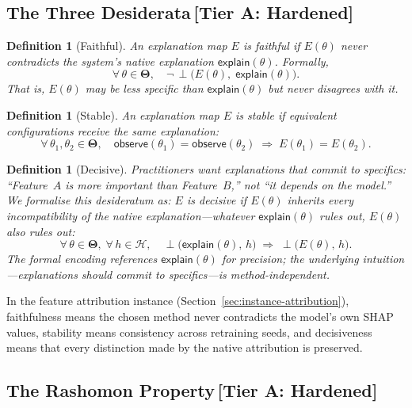 \documentclass[11pt,a4paper]{article}
\newtheorem{definition}[theorem]{Definition}
\newcommand{\Params}{\mathbf{\Theta}}
\newcommand{\sH}{\mathcal{H}}
\newcommand{\incomp}{\perp}
\begin{document}
\subsection{The Three Desiderata\,\textnormal{\normalsize[Tier A: Hardened]}}

\begin{definition}[Faithful]
\label{def:faithful}
An explanation map $E$ is \emph{faithful} if $E(\theta)$ never contradicts the
system's native explanation $\mathsf{explain}(\theta)$.  Formally,
\[
  \forall\,\theta \in \Params,\quad
  \neg\,\incomp\bigl(E(\theta),\;\mathsf{explain}(\theta)\bigr).
\]
That is, $E(\theta)$ may be less specific than $\mathsf{explain}(\theta)$ but
never disagrees with it.
\end{definition}

\begin{definition}[Stable]
\label{def:stable}
An explanation map $E$ is \emph{stable} if equivalent configurations receive
the same explanation:
\[
  \forall\,\theta_1, \theta_2 \in \Params,\quad
  \mathsf{observe}(\theta_1) = \mathsf{observe}(\theta_2)
  \;\Longrightarrow\;
  E(\theta_1) = E(\theta_2).
\]
\end{definition}

\begin{definition}[Decisive]
\label{def:decisive}
Practitioners want explanations that commit to specifics: ``Feature~$A$ is
more important than Feature~$B$,'' not ``it depends on the model.''
We formalise this desideratum as: $E$ is \emph{decisive} if $E(\theta)$
inherits every incompatibility of the native explanation---whatever
$\mathsf{explain}(\theta)$ rules out, $E(\theta)$ also rules out:
\[
  \forall\,\theta \in \Params,\;\forall\,h \in \sH,\quad
  \incomp\bigl(\mathsf{explain}(\theta),\, h\bigr)
  \;\Longrightarrow\;
  \incomp\bigl(E(\theta),\, h\bigr).
\]
The formal encoding references $\mathsf{explain}(\theta)$ for
precision; the underlying intuition---explanations should commit to
specifics---is method-independent.
\end{definition}

In the feature attribution instance (Section~\ref{sec:instance-attribution}),
faithfulness means the chosen method never contradicts the model's own SHAP
values, stability means consistency across retraining seeds, and decisiveness
means that every distinction made by the native attribution is preserved.

\subsection{The Rashomon Property\,\textnormal{\normalsize[Tier A: Hardened]}}
\end{document}

